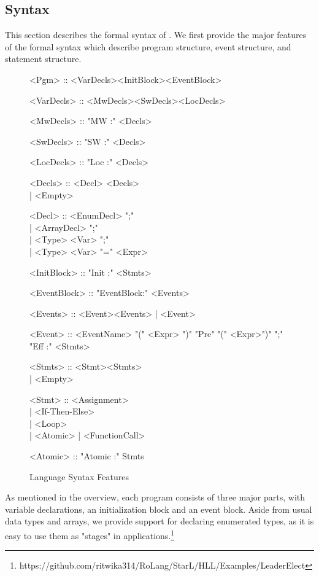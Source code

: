 \subsection{Syntax}
\label{sect:syntax}
This section describes the formal syntax of \rolang. We first provide the major features of the formal syntax which describe program structure, event structure, and statement structure. 
\begin{figure}[ht!]
\footnotesize
\begin{center}
\noindent\begin{minipage}{.45\textwidth}
\begin{grammar}
<Pgm> :: <VarDecls><InitBlock><EventBlock>

<VarDecls> :: <MwDecls><SwDecls><LocDecls>

<MwDecls> :: "MW :" <Decls>

<SwDecls> :: "SW :" <Decls>

<LocDecls> :: "Loc :" <Decls>

<Decls> :: <Decl> <Decls> \\
         | <Empty>

<Decl> :: <EnumDecl> ";" \\
         | <ArrayDecl> ";" \\
         | <Type> <Var> ";"\\
         | <Type> <Var> "=" <Expr>
 
<InitBlock> :: "Init :" <Stmts>
\end{grammar}
\end{minipage}\hfill
\noindent\begin{minipage}{.45\textwidth}
\begin{grammar}
<EventBlock> :: "EventBlock:" <Events>

<Events> :: <Event><Events> | <Event>

<Event> :: <EventName> "(" <Expr> ")" "Pre" "(" <Expr>")" ";" "Eff :" <Stmts> 

<Stmts> :: <Stmt><Stmts> \\
		| <Empty>

<Stmt> :: <Assignment> \\
		| <If-Then-Else> \\
        | <Loop>\\
        | <Atomic>
		| <FunctionCall>
        
<Atomic> :: "Atomic :" Stmts
\end{grammar}
\end{minipage}
\end{center}
\caption{Language Syntax Features}
\end{figure}
As mentioned in the overview, each program consists of three major parts, with variable declarations, an initialization block and an event block. Aside from usual data types and arrays, we provide support for declaring enumerated types, as it is easy to use them as "stages" in applications.\footnote{https://github.com/ritwika314/RoLang/StarL/HLL/Examples/LeaderElect}

